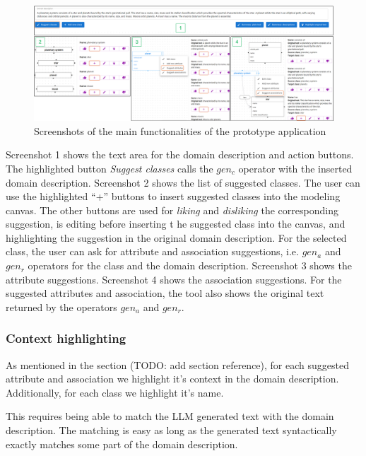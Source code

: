 \begin{figure}[!h]
    \centering
    \includegraphics[scale=0.22]{img/assistant-features.png}
    \caption{\centering Screenshots of the main functionalities of the prototype application}
    \label{fig:assistant-features}
\end{figure}

Screenshot 1 shows the text area for the domain description and action buttons. The highlighted button \textit{Suggest classes} calls the $gen_c$ operator with the inserted domain description. Screenshot 2 shows the list of suggested classes. The user can use the highlighted ``+'' buttons to insert suggested classes into the modeling canvas. The other buttons are used for \textit{liking} and \textit{disliking} the corresponding suggestion, is editing before inserting t he suggested class into the canvas, and highlighting the suggestion in the original domain description. For the selected class, the user can ask for attribute and association suggestions, i.e. $gen_a$ and $gen_r$ operators for the class and the domain description. Screenshot 3 shows the attribute suggestions. Screenshot 4 shows the association suggestions. For the suggested attributes and association, the tool also shows the original text returned by the operators $gen_a$ and $gen_r$.


\subsubsection{Context highlighting}

As mentioned in the section (TODO: add section reference), for each suggested attribute and association we highlight it's context in the domain description. Additionally, for each class we highlight it's name.

This requires being able to match the LLM generated text with the domain description. The matching is easy as long as the generated text syntactically exactly matches some part of the domain description. %

